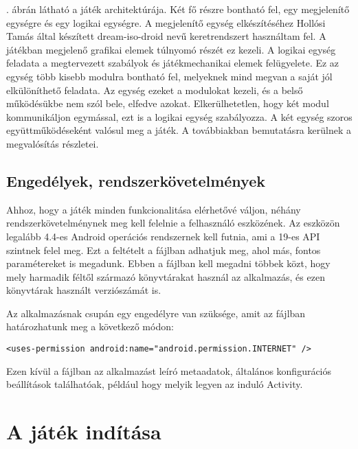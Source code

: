 . ábrán látható a játék architektúrája. 
Két fő részre bontható fel, egy megjelenítő egységre és egy logikai egységre. 
A megjelenítő egység elkészítéséhez Hollósi Tamás által készített dream-iso-droid nevű keretrendszert használtam fel. 
A játékban megjelenő grafikai elemek túlnyomó részét ez kezeli. 
A logikai egység feladata a megtervezett szabályok és játékmechanikai elemek felügyelete. 
Ez az egység több kisebb modulra bontható fel, melyeknek mind megvan a saját jól elkülöníthető feladata. 
Az egység ezeket a modulokat kezeli, és a belső működésükbe nem szól bele, elfedve azokat. 
Elkerülhetetlen, hogy két modul kommunikáljon egymással, ezt is a logikai egység szabályozza. 
A két egység szoros együttműködéseként valósul meg a játék. 
A továbbiakban bemutatásra kerülnek a megvalósítás részletei. 


\subsection*{Engedélyek, rendszerkövetelmények}
\label{requirements}

Ahhoz, hogy a játék minden funkcionalitása elérhetővé váljon, néhány rendszerkövetelménynek meg kell felelnie a felhasználó eszközének. 
Az eszközön legalább 4.4-es Android operációs rendszernek kell futnia, ami a 19-es API szintnek felel meg.
Ezt a feltételt a  fájlban adhatjuk meg, ahol más, fontos paramétereket is megadunk. 
Ebben a fájlban kell megadni többek közt, hogy mely harmadik féltől származó könyvtárakat használ az alkalmazás, és ezen könyvtárak használt verziószámát is. 

Az alkalmazásnak csupán egy engedélyre van szüksége, amit az  fájlban határozhatunk meg a következő módon:

\begin{lstlisting}
<uses-permission android:name="android.permission.INTERNET" />
\end{lstlisting}

Ezen kívül a fájlban az alkalmazást leíró metaadatok, általános konfigurációs beállítások találhatóak, például hogy melyik legyen az induló Activity.

\section{A játék indítása}
\label{jatekinditas}


